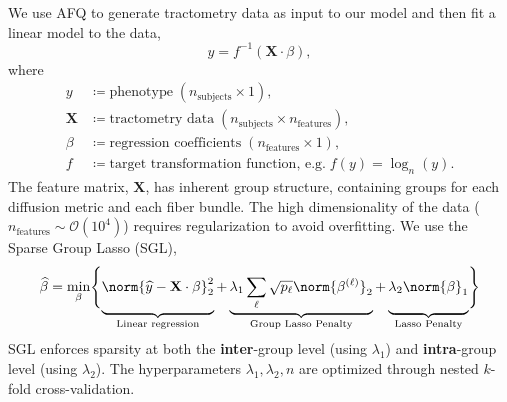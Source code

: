 \documentclass[a0paper,portrait,fontscale=0.395]{baposter}
\begin{document}
\begin{poster}
{\begingroup
\setlength\abovedisplayskip{0.5em}
We use AFQ to generate tractometry data as input to our model and then fit a linear model to the data,
\begin{equation*}
    y = f^{-1} \left( \mathbf{X} \cdot \beta \right),
\end{equation*}
where
\vspace{1em}
\begin{align*}
    y &\coloneqq \text{phenotype} \; (n_\text{subjects} \times 1), \\
    \mathbf{X} &\coloneqq \text{tractometry data} \; (n_\text{subjects} \times n_\text{features}), \\
    \beta &\coloneqq \text{regression coefficients} \; (n_\text{features} \times 1), \\
    f &\coloneqq \text{target transformation function, e.g.} \; f(y) = \log_n(y).
\end{align*}
The feature matrix, $\mathbf{X}$, has inherent group structure, containing groups for each diffusion metric and each fiber bundle.
The high dimensionality of the data ($n_\text{features} \sim \mathcal{O}(10^4)$) requires regularization to avoid overfitting. We use the Sparse Group Lasso (SGL),
\vspace{-0.5em}
\begin{equation*}
    \widehat{\beta} = \min_\beta \Biggl\{
        \underbrace{
            \vphantom{\lambda_1 \displaystyle \sum_\ell \sqrt{p_\ell} \norm{\beta^{(\ell)}}_2}
            \norm{\widehat{y} - \mathbf{X} \cdot \beta}_2^2
        }_{\text{Linear regression}}
        + \underbrace{
            \lambda_1 \displaystyle \sum_\ell \sqrt{p_\ell} \norm{\beta^{(\ell)}}_2
        }_{\text{Group Lasso Penalty}}
        + \underbrace{
            \vphantom{\lambda_1 \displaystyle \sum_\ell \sqrt{p_\ell} \norm{\beta^{(\ell)}}_2}
            \lambda_2 \norm{\beta}_1
        }_{\text{Lasso Penalty}}
    \Biggl\}
\end{equation*}
SGL enforces sparsity at both the \textbf{inter}-group level (using $\lambda_1$) and \textbf{intra}-group level (using $\lambda_2$). The hyperparameters $\lambda_1, \lambda_2, n$ are optimized through nested $k$-fold cross-validation.
\endgroup
}


\end{poster}
\end{document}
